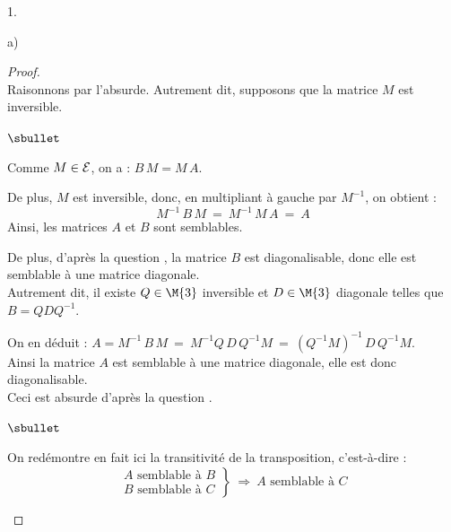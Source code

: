\documentclass[11pt]{article}%
\begin{document}
\begin{noliste}{1.}
\begin{noliste}{a)}
    \begin{proof}~\\
      Raisonnons par l'absurde. Autrement dit, supposons que la 
      matrice $M$ est inversible.
      \begin{noliste}{$\sbullet$}
	\item Comme $M\in {\cal E}$, on a : $B \, M = M \, A$.
	
	\item De plus, $M$ est inversible, donc, en multipliant à 
	gauche par $M^{-1}$, on obtient : 
	\[
	  M^{-1} \, B \, M \ = \ M^{-1} \, M \, A \ = \ A
	\]
	Ainsi, les matrices $A$ et $B$ sont semblables.
	
	
	\newpage
	
	
	\item De plus, d'après la question , la 
	matrice $B$ est diagonalisable, donc elle est semblable à une 
	matrice diagonale.\\
	Autrement dit, il existe $Q \in \M{3}$ inversible et $D \in 
	\M{3}$ diagonale telles que $B=QDQ^{-1}$.
	
	\item On en déduit : $A = M^{-1} \, B \, M \ = \ M^{-1} Q \, D 
	\, Q^{-1} M \ = \ (Q^{-1} M)^{-1} \, D \, Q^{-1} M$.\\
	Ainsi la matrice $A$ est semblable à une matrice diagonale, elle
	est donc diagonalisable.\\
	Ceci est absurde d'après la question .
      \end{noliste}
      
      
      \begin{remark}
        \begin{noliste}{$\sbullet$}
	  \item On redémontre en fait ici la transitivité de la 
	  transposition, c'est-à-dire :
	  \[
	    \left. 
	    \begin{array}{c}
	      \text{$A$ semblable à $B$}\\
	      \text{$B$ semblable à $C$}
	    \end{array}
	    \right\}
	    \ \Rightarrow \
	    \text{$A$ semblable à $C$}
	  \]
	  

\end{noliste}
\end{remark}
\end{proof}
\end{noliste}
\end{noliste}
\end{document}
